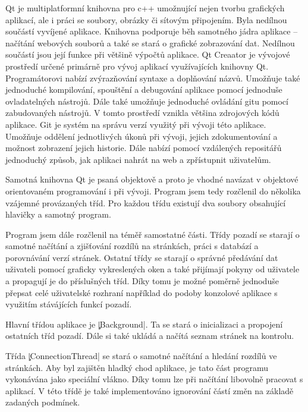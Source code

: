 
Qt je multiplatformní knihovna pro c++ umožnující nejen tvorbu grafických aplikací, ale i práci se soubory, obrázky či sítovým připojením.
Byla nedílnou součástí vyvíjené aplikace.
Knihovna podporuje běh samotného jádra aplikace -- načítání webových souborů a také se stará o grafické zobrazování dat.
Nedílnou součástí jsou její funkce při většině výpočtů aplikace.
Qt Creaator je vývojové prostředí určené primárně pro vývoj aplikací využívajících knihovny Qt.
Programátorovi nabízí zvýrazňování syntaxe a doplňování názvů.
Umožňuje také jednoduché kompilování, spouštění a debugování aplikace pomocí jednoduše ovladatelných nástrojů.
Dále také umožňuje jednoduché ovládání gitu pomocí zabudovaných nástrojů.
V tomto prostředí vznikla většina zdrojových kódů aplikace.
Git je systém na správu verzí využitý při vývoji této aplikace.
Umožňuje oddělení jednotlivých úkonů při vývoji, jejich zdokumentování a možnost zobrazení jejich historie.
Dále nabízí pomocí vzdálených repositářů jednoduchý způsob, jak aplikaci nahrát na web a zpřístupnit uživatelům.

	Samotná knihovna Qt je psaná objektově a proto je vhodné navázat v objektové orientovaném programování i při vývoji.
	Program jsem tedy rozčlenil do několika vzájemné provázaných tříd.
	Pro každou třídu existují dva soubory obsahující hlavičky a samotný program.

	Program jsem dále rozčlenil na téměř samostatné části.
	Třídy pozadí se starají o samotné načítání a zjišťování rozdílů na stránkách, práci s databází a porovnávání verzí stránek.
	Ostatní třídy se starají o správné předávání dat uživateli pomocí graficky vykreslených oken a také přijímají pokyny od uživatele a propagují je do příslušných tříd.
	Díky tomu je možné poměrně jednoduše přepsat celé uživatelské rozhraní například do podoby konzolové aplikace s využitím stávájících funkcí pozadí.


Hlavní třídou aplikace je \c|Background|. Ta se stará o inicializaci a propojení ostatních tříd pozadí.
Dále si také ukládá a načítá seznam stránek na kontrolu.

Třída \c|ConnectionThread| se stará o samotné načítání a hledání rozdílů ve stránkách. Aby byl zajištěn hladký chod aplikace, je tato část programu vykonávána jako speciální vlákno. %
Díky tomu lze při načítání libovolně pracovat s aplikací.
V této třídě je také implementováno ignorování částí změn na základě zadaných podmínek.

